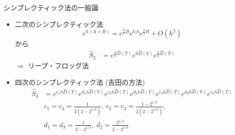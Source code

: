 \begin{frame}[t,fragile]{シンプレクティック法の一般論}
  \begin{itemize}
  \item 二次のシンプレクティック法
    \[
    e^{h (A+B)} = e^{\frac{h}{2}B} e^{hA} e^{\frac{h}{2}B} + O(h^3)
    \]
    から
    \begin{align*}
      \hat{S}_2 &= e^{\frac{h}{2}\hat{D}(T)} e^{h\hat{D}(V)} e^{\frac{h}{2}\hat{D}(T)}
    \end{align*}
    $\Rightarrow$ リープ・フロッグ法
  \item 四次のシンプレクティック法 (吉田の方法)
    \begin{align*}
      \hat{S}_4 &= e^{c_1h\hat{D}(T)} e^{d_1 h\hat{D}(V)} e^{c_2 h\hat{D}(T)} e^{d_2 h\hat{D}(V)} e^{c_3h\hat{D}(T)} e^{d_3 h\hat{D}(V)} e^{c_4h\hat{D}(T)} \\
      & c_1 = c_4 = \frac{1}{2(2-2^{1/3})}, \ c_2 = c_3 = \frac{1-2^{1/3}}{2(2-2^{1/3})}, \\
      & d_1 = d_3 = \frac{1}{2-2^{1/3}}, \ d_2 = \frac{2^{1/3}}{2-2^{1/3}}
    \end{align*}
  \end{itemize}
\end{frame}
